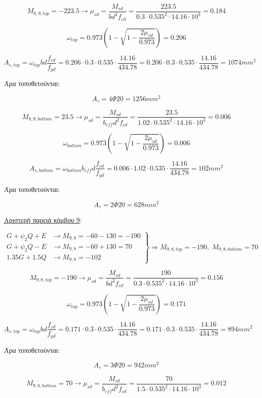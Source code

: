 \[
M_{8,9,top} = -223.5 \rightarrow \mu_{sd} = \dfrac{M_{sd}}{b d^2 f_{cd}} = \dfrac{223.5}{0.3\cdot0.535^2\cdot14.16\cdot10^3} = 0.184
\]

\[
\omega_{top} = 0.973\left( 1 - \sqrt{1 - \dfrac{2\mu_{sd}}{0.973}} \right) = 0.206
\]

\[
A_{s,top} = \omega_{top}b d \dfrac{f_{cd}}{f_{yd}} = 0.206\cdot 0.3 \cdot 0.535 \cdot \dfrac{14.16}{434.78} = 0.206\cdot 0.3 \cdot 0.535 \cdot \dfrac{14.16}{434.78} = 1074mm^2
\]

\noindent
Άρα τοποθετούνται:

\[
A_{\tau} = 4\Phi20 = 1256mm^2
\]

\[
M_{8,9,bottom} = 23.5 \rightarrow \mu_{sd} = \dfrac{M_{sd}}{b_{eff} d^2 f_{cd}} = \dfrac{23.5}{1.02\cdot0.535^2\cdot14.16\cdot10^3} = 0.006
\]

\[
\omega_{bottom} = 0.973\left( 1 - \sqrt{1 - \dfrac{2\mu_{sd}}{0.973}} \right) = 0.006
\]

\[
A_{s,bottom} = \omega_{bottom}b_{eff} d \dfrac{f_{cd}}{f_{yd}} = 0.006\cdot 1.02 \cdot 0.535 \cdot \dfrac{14.16}{434.78} = 102mm^2
\]

\noindent
Άρα τοποθετούνται:

\[
A_{\tau} = 2\Phi20 = 628mm^2
\]


\noindent
\underline{Αριστερή παρειά κόμβου 9}:

\[
\left.
   \begin{array}{ll}
       G+\psi_2 Q + Ε & \rightarrow M_{9,8} = -60-130 = -190 \\
       G+\psi_2 Q - Ε & \rightarrow M_{9,8} = -60+130 = 70 \\
       1.35G + 1.5Q     & \rightarrow M_{9,8} = -102
   \end{array}
\right \} \Rightarrow M_{9,8,top} = -190,\; M_{9,8,bottom} = 70
\]

\[
M_{9,8,top} = -190 \rightarrow \mu_{sd} = \dfrac{M_{sd}}{b d^2 f_{cd}} = \dfrac{190}{0.3\cdot0.535^2\cdot14.16\cdot10^3} = 0.156
\]

\[
\omega_{top} = 0.973\left( 1 - \sqrt{1 - \dfrac{2\mu_{sd}}{0.973}} \right) = 0.171
\]

\[
A_{s,top} = \omega_{top}b d \dfrac{f_{cd}}{f_{yd}} = 0.171\cdot 0.3 \cdot 0.535 \cdot \dfrac{14.16}{434.78} = 0.171\cdot 0.3 \cdot 0.535 \cdot \dfrac{14.16}{434.78} = 894mm^2
\]

\noindent
Άρα τοποθετούνται:

\[
A_{\tau} = 3\Phi20 = 942mm^2
\]

\[
M_{9,8,bottom} = 70 \rightarrow \mu_{sd} = \dfrac{M_{sd}}{b_{eff} d^2 f_{cd}} = \dfrac{70}{1.5\cdot0.535^2\cdot14.16\cdot10^3} = 0.012
\]

